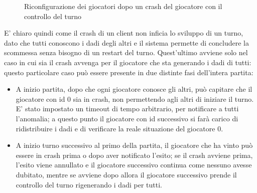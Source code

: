 \documentclass{llncs}
\begin{document}
\begin{figure}[H]
\begin{minipage}{0.45\textwidth}
	\end{minipage}
	\caption{\small{Riconfigurazione dei giocatori dopo un crash del giocatore con il controllo del turno}}
\end{figure}
E' chiaro quindi come il crash di un client non inficia lo sviluppo di un turno, dato che tutti conoscono i dadi degli altri e il sistema permette di concludere la scommessa senza bisogno di un restart del turno. Quest'ultimo avviene solo nel caso in cui sia il crash avvenga per il giocatore che sta generando i dadi di tutti: questo particolare caso può essere presente in due distinte fasi dell'intera partita:
\begin{itemize}
	\item A inizio partita, dopo che ogni giocatore conosce gli altri, può capitare che il giocatore con id 0 sia in crash, non permettendo agli altri di iniziare il turno. E' stato impostato un timeout di tempo arbitrario, per notificare a tutti l'anomalia; a questo punto il giocatore con id successivo si farà carico di ridistribuire i dadi e di verificare la reale situazione del giocatore 0.
	\item A inizio turno successivo al primo della partita, il giocatore che ha vinto può essere in crash prima o dopo aver notificato l'esito; se il crash avviene prima, l'esito viene annullato e il giocatore successivo continua come nessuno avesse dubitato, mentre se avviene dopo allora il giocatore successivo prende il controllo del turno rigenerando i dadi per tutti.
\end{itemize}
	
\end{document}

